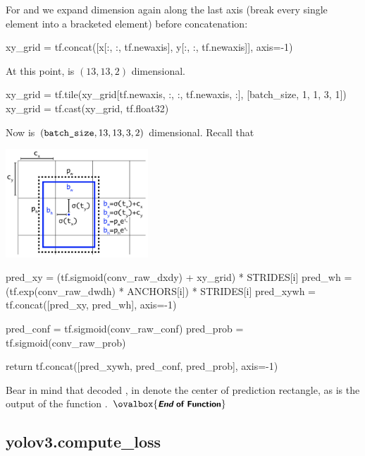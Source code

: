 \documentclass[10pt,a4paper]{article}
\newcommand{\END}{\text{}\hfill$\ovalbox{\small\text{\bfseries\sffamily {\itshape End} of Function}}$\bigskip}
\begin{document}
For  and  we expand dimension again along the last axis (break every single element into a bracketed element) before concatenation:
\begin{py}
    xy_grid = tf.concat([x[:, :, tf.newaxis], y[:, :, tf.newaxis]], axis=-1)
\end{py}
At this point,  is $(13,13,2)$ dimensional.
\begin{py}
    xy_grid = tf.tile(xy_grid[tf.newaxis, :, :, tf.newaxis, :], [batch_size, 1, 1, 3, 1])
    xy_grid = tf.cast(xy_grid, tf.float32)
\end{py}
Now  is $(\code{batch_size}, 13, 13, 3, 2)$ dimensional. Recall that 
\begin{center}
\includegraphics[width=0.4\textwidth]{./decode_anchor.png}
\end{center}
\begin{py}
    pred_xy = (tf.sigmoid(conv_raw_dxdy) + xy_grid) * STRIDES[i]
    pred_wh = (tf.exp(conv_raw_dwdh) * ANCHORS[i]) * STRIDES[i]
    pred_xywh = tf.concat([pred_xy, pred_wh], axis=-1)

    pred_conf = tf.sigmoid(conv_raw_conf)
    pred_prob = tf.sigmoid(conv_raw_prob)

    return tf.concat([pred_xywh, pred_conf, pred_prob], axis=-1)
\end{py}
Bear in mind that decoded ,  in  denote the center of prediction rectangle, as is the output of the function . \END



\subsection{yolov3.compute\_loss}
\end{document}

